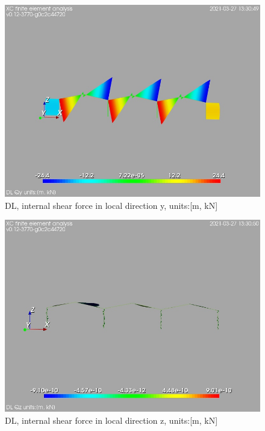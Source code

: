 \begin{figure}
\begin{center}
\includegraphics[width=\linewidth]{calc_results/sole_zeinali/text/graphics/resSimplLC/DLallMemberSetQy}
\caption{DL, internal shear force in local direction y, units:[m, kN]}
\end{center}
\end{figure}
\begin{figure}
\begin{center}
\includegraphics[width=\linewidth]{calc_results/sole_zeinali/text/graphics/resSimplLC/DLallMemberSetQz}
\caption{DL, internal shear force in local direction z, units:[m, kN]}
\end{center}
\end{figure}
